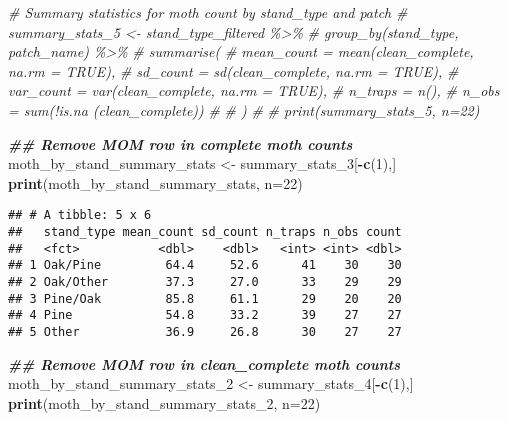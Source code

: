 \documentclass[
]{article}
\newenvironment{Shaded}{\begin{snugshade}}{\end{snugshade}}
\newcommand{\AttributeTok}[1]{\textcolor[rgb]{0.13,0.29,0.53}{#1}}
\newcommand{\CommentTok}[1]{\textcolor[rgb]{0.56,0.35,0.01}{\textit{#1}}}
\newcommand{\DecValTok}[1]{\textcolor[rgb]{0.00,0.00,0.81}{#1}}
\newcommand{\DocumentationTok}[1]{\textcolor[rgb]{0.56,0.35,0.01}{\textbf{\textit{#1}}}}
\newcommand{\FunctionTok}[1]{\textcolor[rgb]{0.13,0.29,0.53}{\textbf{#1}}}
\newcommand{\NormalTok}[1]{#1}
\newcommand{\OtherTok}[1]{\textcolor[rgb]{0.56,0.35,0.01}{#1}}
\newcommand{\SpecialCharTok}[1]{\textcolor[rgb]{0.81,0.36,0.00}{\textbf{#1}}}
\begin{document}
\begin{Shaded}
\begin{Highlighting}[]
\CommentTok{\# Summary statistics for moth count by stand\_type and patch}
\CommentTok{\# summary\_stats\_5 \textless{}{-} stand\_type\_filtered \%\textgreater{}\%}
\CommentTok{\#   group\_by(stand\_type, patch\_name) \%\textgreater{}\%}
\CommentTok{\#   summarise(}
\CommentTok{\#     mean\_count = mean(clean\_complete, na.rm = TRUE),}
\CommentTok{\#     sd\_count = sd(clean\_complete, na.rm = TRUE),}
\CommentTok{\#     var\_count = var(clean\_complete, na.rm = TRUE),}
\CommentTok{\#     n\_traps = n(),}
\CommentTok{\#     n\_obs = sum(!is.na (clean\_complete))}
\CommentTok{\#     }
\CommentTok{\#   )}
\CommentTok{\# }
\CommentTok{\# print(summary\_stats\_5, n=22)}

\DocumentationTok{\#\# Remove MOM row in \textquotesingle{}complete\textquotesingle{} moth counts}
\NormalTok{moth\_by\_stand\_summary\_stats }\OtherTok{\textless{}{-}}\NormalTok{ summary\_stats\_3[}\SpecialCharTok{{-}}\FunctionTok{c}\NormalTok{(}\DecValTok{1}\NormalTok{),]}
\FunctionTok{print}\NormalTok{(moth\_by\_stand\_summary\_stats, }\AttributeTok{n=}\DecValTok{22}\NormalTok{)}
\end{Highlighting}
\end{Shaded}

\begin{verbatim}
## # A tibble: 5 x 6
##   stand_type mean_count sd_count n_traps n_obs count
##   <fct>           <dbl>    <dbl>   <int> <int> <dbl>
## 1 Oak/Pine         64.4     52.6      41    30    30
## 2 Oak/Other        37.3     27.0      33    29    29
## 3 Pine/Oak         85.8     61.1      29    20    20
## 4 Pine             54.8     33.2      39    27    27
## 5 Other            36.9     26.8      30    27    27
\end{verbatim}

\begin{Shaded}
\begin{Highlighting}[]
\DocumentationTok{\#\# Remove MOM row in \textquotesingle{}clean\_complete\textquotesingle{} moth counts}
\NormalTok{moth\_by\_stand\_summary\_stats\_2 }\OtherTok{\textless{}{-}}\NormalTok{ summary\_stats\_4[}\SpecialCharTok{{-}}\FunctionTok{c}\NormalTok{(}\DecValTok{1}\NormalTok{),]}
\FunctionTok{print}\NormalTok{(moth\_by\_stand\_summary\_stats\_2, }\AttributeTok{n=}\DecValTok{22}\NormalTok{)}
\end{Highlighting}
\end{Shaded}
\end{document}
